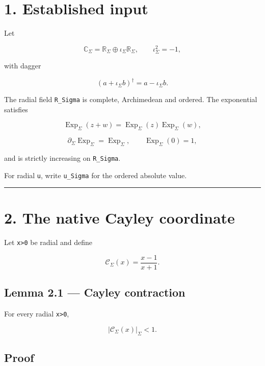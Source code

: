 \hypertarget{established-input}{%
\section{1. Established input}\label{established-input}}

Let

\[
\mathbb C_\Sigma
=
\mathbb R_\Sigma\oplus\iota_\Sigma\mathbb R_\Sigma,
\qquad
\iota_\Sigma^2=-1,
\]

with dagger

\[
(a+\iota_\Sigma b)^\dagger=a-\iota_\Sigma b.
\]

The radial field \texttt{R\_Sigma} is complete, Archimedean and ordered. The exponential
satisfies

\[
\operatorname{Exp}_\Sigma(z+w)
=
\operatorname{Exp}_\Sigma(z)
\operatorname{Exp}_\Sigma(w),
\]

\[
\partial_\Sigma\operatorname{Exp}_\Sigma
=
\operatorname{Exp}_\Sigma,
\qquad
\operatorname{Exp}_\Sigma(0)=1,
\]

and is strictly increasing on \texttt{R\_Sigma}.

For radial \texttt{u}, write \texttt{\textbar{}u\textbar{}\_Sigma} for the ordered absolute value.

\begin{center}\rule{0.5\linewidth}{0.5pt}\end{center}

\hypertarget{the-native-cayley-coordinate}{%
\section{2. The native Cayley coordinate}\label{the-native-cayley-coordinate}}

Let \texttt{x\textgreater{}0} be radial and define

\[
\boxed{
\mathcal C_\Sigma(x)
=
\frac{x-1}{x+1}.
}
\]

\hypertarget{lemma-2.1-cayley-contraction}{%
\subsection{Lemma 2.1 --- Cayley contraction}\label{lemma-2.1-cayley-contraction}}

For every radial \texttt{x\textgreater{}0},

\[
\left|\mathcal C_\Sigma(x)\right|_\Sigma<1.
\]

\hypertarget{proof}{%
\subsection{Proof}\label{proof}}

